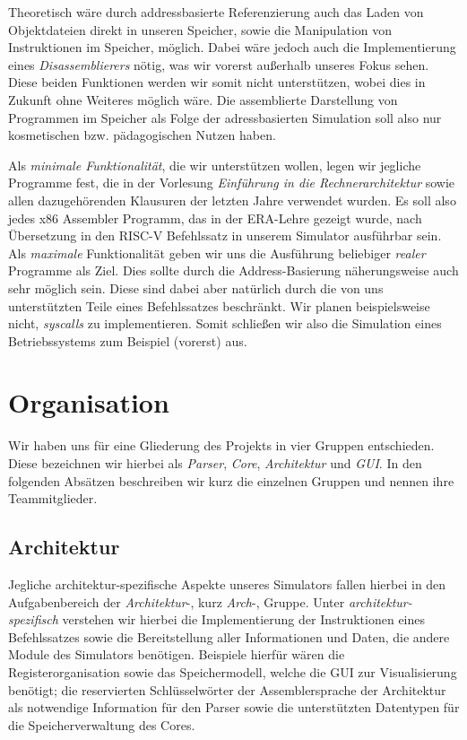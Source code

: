 Theoretisch wäre durch addressbasierte Referenzierung auch das Laden von
Objektdateien direkt in unseren Speicher, sowie die Manipulation von
Instruktionen im Speicher, möglich. Dabei wäre jedoch auch die Implementierung
eines \emph{Disassemblierers} nötig, was wir vorerst außerhalb unseres Fokus
sehen. Diese beiden Funktionen werden wir somit nicht unterstützen, wobei dies
in Zukunft ohne Weiteres möglich wäre. Die assemblierte Darstellung von
Programmen im Speicher als Folge der adressbasierten Simulation soll also nur
kosmetischen bzw. pädagogischen Nutzen haben.

Als \emph{minimale Funktionalität}, die wir unterstützen wollen, legen wir
jegliche Programme fest, die in der Vorlesung \emph{Einführung in die
  Rechnerarchitektur} sowie allen dazugehörenden Klausuren der letzten Jahre
verwendet wurden. Es soll also jedes x86 Assembler Programm, das in der
ERA-Lehre gezeigt wurde, nach Übersetzung in den RISC-V Befehlssatz in unserem
Simulator ausführbar sein. Als \emph{maximale} Funktionalität geben wir uns die
Ausführung beliebiger \emph{realer} Programme als Ziel. Dies sollte durch die
Address-Basierung näherungsweise auch sehr möglich sein. Diese sind dabei aber
natürlich durch die von uns unterstützten Teile eines Befehlssatzes
beschränkt. Wir planen beispielsweise nicht, \emph{syscalls} zu
implementieren. Somit schließen wir also die Simulation eines Betriebssystems
zum Beispiel (vorerst) aus.

\section{Organisation}

Wir haben uns für eine Gliederung des Projekts in vier Gruppen entschieden.
Diese bezeichnen wir hierbei als \emph{Parser}, \emph{Core},
\emph{Architektur} und \emph{GUI}. In den folgenden Absätzen beschreiben wir kurz die
einzelnen Gruppen und nennen ihre Teammitglieder.

\subsection{Architektur}

Jegliche architektur-spezifische Aspekte
unseres Simulators fallen hierbei in den Aufgabenbereich der
\emph{Architektur}-, kurz \emph{Arch}-, Gruppe. Unter
\emph{architektur-spezifisch} verstehen wir hierbei die Implementierung der
Instruktionen eines Befehlssatzes sowie die Bereitstellung aller Informationen
und Daten, die andere Module des Simulators benötigen. Beispiele hierfür wären
die Registerorganisation sowie das Speichermodell, welche die GUI zur
Visualisierung benötigt; die reservierten Schlüsselwörter der Assemblersprache
der Architektur als notwendige Information für den Parser sowie die
unterstützten Datentypen für die Speicherverwaltung des Cores.

